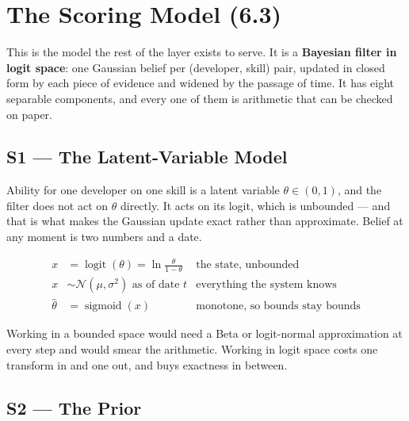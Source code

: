 \documentclass[11pt,a4paper]{article}
\DeclareMathOperator{\logit}{logit}
\DeclareMathOperator{\sig}{sigmoid}
\newenvironment{keyeq}{%
  \begin{shaded}
  \centering
}{%
  \end{shaded}
}
\begin{document}
\section{The Scoring Model (6.3)}
\label{sec:scoring}

This is the model the rest of the layer exists to serve. It is a
\textbf{Bayesian filter in logit space}: one Gaussian belief per
(developer, skill) pair, updated in closed form by each piece of evidence
and widened by the passage of time. It has eight separable components, and
every one of them is arithmetic that can be checked on paper.

\subsection{S1 --- The Latent-Variable Model}

Ability for one developer on one skill is a latent variable $\theta \in
(0,1)$, and the filter does not act on $\theta$ directly. It acts on its
logit, which is unbounded --- and that is what makes the Gaussian update
exact rather than approximate. Belief at any moment is two numbers and a
date.

\begin{keyeq}
\begin{align*}
x &= \logit(\theta) = \ln\!\frac{\theta}{1-\theta}
   & \text{the state, unbounded}\\[4pt]
x &\sim \mathcal{N}(\mu,\sigma^2) \text{ as of date } t
   & \text{everything the system knows}\\[4pt]
\hat\theta &= \sig(x)
   & \text{monotone, so bounds stay bounds}
\end{align*}
\end{keyeq}

Working in a bounded space would need a Beta or logit-normal approximation
at every step and would smear the arithmetic. Working in logit space costs
one transform in and one out, and buys exactness in between.

\subsection{S2 --- The Prior}
\end{document}
